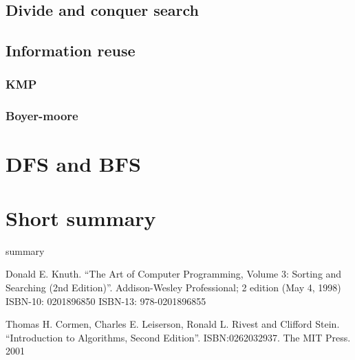 \documentclass{article}
\begin{document}
\subsection{Divide and conquer search}


\subsection{Information reuse}

\subsubsection{KMP}

\subsubsection{Boyer-moore}

\section{DFS and BFS}

\section{Short summary} 
summary

\begin{thebibliography}{99}

Donald E. Knuth. ``The Art of Computer Programming, Volume 3: Sorting and Searching (2nd Edition)''. Addison-Wesley Professional; 2 edition (May 4, 1998) ISBN-10: 0201896850 ISBN-13: 978-0201896855

Thomas H. Cormen, Charles E. Leiserson, Ronald L. Rivest and Clifford Stein. 
``Introduction to Algorithms, Second Edition''. ISBN:0262032937. The MIT Press. 2001

\end{thebibliography}

\ifx\wholebook\relax\else
\end{document}
